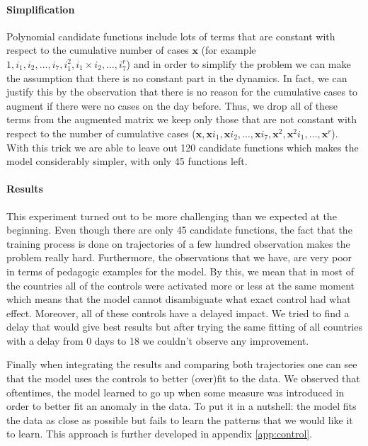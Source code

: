\documentclass[12pt, letterpaper]{article}
\begin{document}
\paragraph{Simplification}
Polynomial candidate functions include lots of terms that are constant with respect to the cumulative number of cases $\mathbf{x}$ (for example $1, i_1, i_2, \dots, i_7, i_1^2, i_1 \times i_2, \dots, i_7^r$) and in order to simplify the problem we can make the assumption that there is no constant part in the dynamics. 
In fact, we can justify this by the observation that there is no reason for the cumulative cases to augment if there were no cases on the day before.
Thus, we drop all of these terms from the augmented matrix we keep only those that are not constant with respect to the number of cumulative cases ($\mathbf{x}, \mathbf{x} i_1, \mathbf{x} i_2, \dots, \mathbf{x} i_7, \mathbf{x}^2, \mathbf{x}^2 i_1, \dots, \mathbf{x}^r$).
With this trick we are able to leave out 120 candidate functions which makes the model considerably simpler, with only 45 functions left.

\paragraph{Results} 

This experiment turned out to be more challenging than we expected at the beginning.
Even though there are only 45 candidate functions, the fact that the training process is done on trajectories of a few hundred observation makes the problem really hard.
Furthermore, the observations that we have, are very poor in terms of pedagogic examples for the model.
By this, we mean that in most of the countries all of the controls were activated more or less at the same moment which means that the model cannot disambiguate what exact control had what effect.
Moreover, all of these controls have a delayed impact.
We tried to find a delay that would give best results but after trying the same fitting of all countries with a delay from 0 days to 18 we couldn't observe any improvement. 

Finally when integrating the results and comparing both trajectories one can see that the model uses the controls to better (over)fit to the data. 
We observed that oftentimes, the model learned to go up when some measure was introduced in order to better fit an anomaly in the data.
To put it in a nutshell: the model fits the data as close as possible but fails to learn the patterns that we would like it to learn. This approach is further developed in appendix \ref{app:control}.
\end{document}
